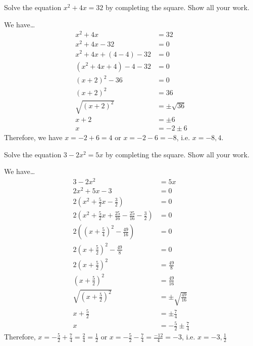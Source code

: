 \documentclass[11pt,letterpaper]{article}
\begin{document}

 Solve the equation $x^2 + 4x= 32$ by completing the square. Show all your work. \pspace

\sol We have\dots \pspace
	\[
	\begin{aligned}
	x^2 + 4x&= 32 \\[0.3cm]
	x^2 + 4x - 32&= 0 \\[0.3cm]
	x^2 + 4x + (4 - 4) - 32&= 0 \\[0.3cm]
	(x^2 + 4x + 4) - 4 - 32&= 0 \\[0.3cm]
	(x + 2)^2 - 36&= 0 \\[0.3cm]
	(x + 2)^2&= 36 \\[0.3cm]
	\sqrt{(x + 2)^2}&= \pm \sqrt{36} \\[0.3cm]
	x + 2&= \pm 6 \\[0.3cm]
	x&= -2 \pm 6
	\end{aligned}
	\] \pspace
Therefore, we have $x= -2 + 6= 4$ or $x= -2 - 6= -8$, i.e. $x= -8, 4$. 





\newpage





 Solve the equation $3 - 2x^2= 5x$ by completing the square. Show all your work. \pspace

\sol We have\dots \pspace
	\[
	\begin{aligned}
	3 - 2x^2&= 5x \\[0.3cm]
	2x^2 + 5x - 3&= 0 \\[0.3cm]
	2 \left( x^2 + \frac{5}{2}x - \frac{3}{2} \right)&= 0 \\[0.3cm]
	2 \left( x^2 + \frac{5}{2}x + \frac{25}{16} - \frac{25}{16} - \frac{3}{2} \right)&= 0 \\[0.3cm]
	2 \left( \left(x + \frac{5}{4} \right)^2 -  \frac{49}{16} \right)&= 0 \\[0.3cm]
	2 \left(x + \frac{5}{2} \right)^2- \frac{49}{8}&= 0 \\[0.3cm]
	2 \left(x + \frac{5}{2} \right)^2&= \frac{49}{8} \\[0.3cm]
	\left(x + \frac{5}{2} \right)^2&= \frac{49}{16} \\[0.3cm]
	\sqrt{\left(x + \frac{5}{2} \right)^2}&= \pm \sqrt{\frac{49}{16}} \\[0.3cm]
	x + \frac{5}{2}&= \pm \frac{7}{4} \\[0.3cm]
	x&= -\frac{5}{2} \pm \frac{7}{4}
	\end{aligned}
	\] \pspace
Therefore, $x= -\frac{5}{2} + \frac{7}{4}= \frac{2}{4}= \frac{1}{2}$ or $x= -\frac{5}{2} - \frac{7}{4}= \frac{-12}{4}= -3$, i.e. $x= -3, \frac{1}{2}$
\end{document}
